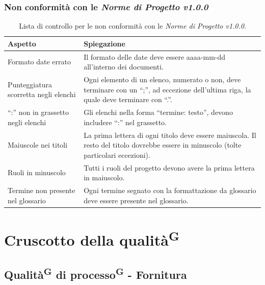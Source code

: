 \documentclass[8pt]{article}
\newcommand{\glossterm}[1]{#1\textsuperscript{G}} %
\begin{document}
\subsubsection{Non conformità con le \textit{Norme di Progetto v1.0.0}}
\renewcommand{\arraystretch}{2.5}
\begin{longtable}{|>{\centering}p{5cm}|>{\centering\arraybackslash}p{10cm}|}
\hline
\rowcolor{white}
    \textbf{Aspetto} & \textbf{Spiegazione} \\
\hline
\endfirsthead
\rowcolor{white}
    \caption{Lista di controllo per le non conformità con le \textit {Norme di Progetto v1.0.0}.}
    \label{table: Lista di controllo per le non conformità con le Norme di Progetto}
\endlastfoot
    Formato date errato & Il formato delle date deve essere aaaa-mm-dd all'interno dei documenti. \\
    \hline
    Punteggiatura scorretta negli elenchi &  Ogni elemento di un elenco, numerato o non, deve terminare con un ``;”, ad eccezione dell'ultima riga, la quale deve terminare con ``.”. \\ 
    \hline
    ``:” non in grassetto negli elenchi & Gli elenchi nella forma ``termine: testo”, devono
    includere ``:” nel grassetto. \\
    \hline
    Maiuscole nei titoli & La prima lettera di ogni titolo deve essere maiuscola. Il resto del
    titolo dovrebbe essere in minuscolo (tolte particolari eccezioni). \\
    \hline
    Ruoli in minuscolo & Tutti i ruoli del progetto devono avere la prima lettera in maiuscolo. \\
    \hline
    Termine non presente nel glossario & Ogni termine segnato con la formattazione da glossario deve essere presente nel glossario. \\
\hline
\end{longtable}
\newpage
\section{Cruscotto della \glossterm{qualità}}\label{sec:cruscotto della qualita}
\subsection{\glossterm{Qualità} di \glossterm{processo} - Fornitura}
\end{document}
